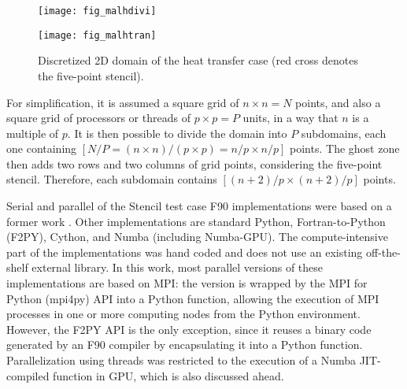     \begin{figure}[hbtp]
    \caption{Discretized 2D domain of the heat transfer case (red cross denotes the five-point stencil).}
    \begin{minipage}[t]{.46\textwidth}
    \begin{center}
    \texttt{[image: fig\_malhdivi]}
    \end{center}
    \vspace{3mm}
    \end{minipage}
    \hfill
    \begin{minipage}[t]{.46\textwidth}
    \begin{center}
    \texttt{[image: fig\_malhtran]}
    \end{center}
    \vspace{3mm}
    \end{minipage}
    \vspace{6mm}
    \legenda{}
    \label{fig_malh}
    \end{figure}

For simplification, it is assumed a square grid of $n \times n = N$ points, and also a square grid of processors or threads of $p \times p = P$ units, in a way that $n$ is a multiple of $p$. It is then possible to divide the domain into $P$ subdomains, each one containing $[ N/P = (n \times n) / (p \times p) = n/p \times n/p ]$ points. The ghost zone then adds two rows and two columns of grid points, considering the five-point stencil.  Therefore, each subdomain contains $ [ (n+2)/p \times (n+2)/p ] $ points.

Serial and parallel of the Stencil test case F90 implementations were based on a former work \cite {Renato2018}. Other implementations are standard Python, Fortran-to-Python (F2PY), Cython, and Numba (including Numba-GPU). The compute-intensive part of the implementations was hand coded and does not use an existing off-the-shelf external library. In this work, most parallel versions of these implementations are based on MPI: the version is wrapped by the MPI for Python (mpi4py) API into a Python function, allowing the execution of MPI processes in one or more computing nodes from the Python environment. However, the F2PY API is the only exception, since it reuses a binary code generated by an F90 compiler by encapsulating it into a Python function. Parallelization using threads was restricted to the execution of a Numba JIT-compiled function in GPU, which is also discussed ahead.

